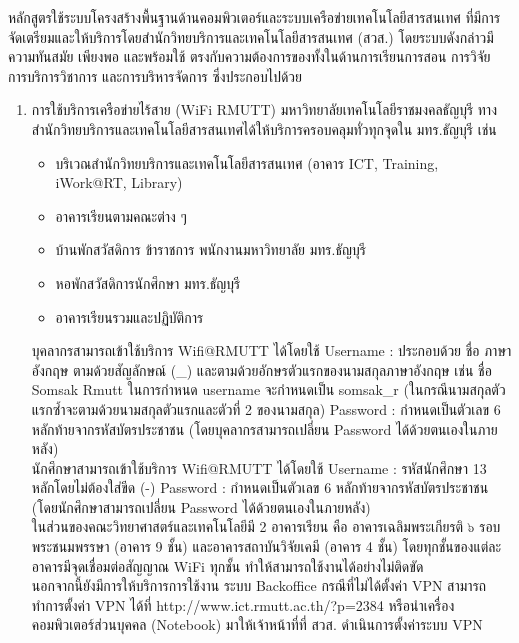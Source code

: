 หลักสูตรใช้ระบบโครงสร้างพื้นฐานด้านคอมพิวเตอร์และระบบเครือข่ายเทคโนโลยีสารสนเทศ ที่มีการจัดเตรียมและให้บริการโดยสำนักวิทยบริการและเทคโนโลยีสารสนเทศ (สวส.) โดยระบบดังกล่าวมีความทันสมัย เพียงพอ และพร้อมใช้ ตรงกับความต้องการของทั้งในด้านการเรียนการสอน การวิจัย การบริการวิชาการ และการบริหารจัดการ ซึ่งประกอบไปด้วย
\begin{enumerate}
	\item การใช้บริการเครือข่ายไร้สาย (WiFi RMUTT) มหาวิทยาลัยเทคโนโลยีราชมงคลธัญบุรี ทางสำนักวิทยบริการและเทคโนโลยีสารสนเทศได้ให้บริการครอบคลุมทั่วทุกจุดใน มทร.ธัญบุรี เช่น
	\begin{itemize}[label=-]
	\item  บริเวณสำนักวิทยบริการและเทคโนโลยีสารสนเทศ (อาคาร ICT, Training, iWork@RT, Library)
	\item อาคารเรียนตามคณะต่าง ๆ
	\item บ้านพักสวัสดิการ ข้าราชการ พนักงานมหาวิทยาลัย มทร.ธัญบุรี
	\item หอพักสวัสดิการนักศึกษา มทร.ธัญบุรี
	\item อาคารเรียนรวมและปฏิบัติการ
\end{itemize}
\hspace*{1cm}บุคลากรสามารถเข้าใช้บริการ Wifi@RMUTT ได้โดยใช้ Username : ประกอบด้วย ชื่อ
	ภาษาอังกฤษ ตามด้วยสัญลักษณ์ (\_) และตามด้วยอักษรตัวแรกของนามสกุลภาษาอังกฤษ เช่น ชื่อ Somsak Rmutt ในการกำหนด username จะกำหนดเป็น somsak\_r (ในกรณีนามสกุลตัวแรกซ้ำจะตามด้วยนามสกุลตัวแรกและตัวที่ 2 ของนามสกุล) Password : กำหนดเป็นตัวเลข 6 หลักท้ายจากรหัสบัตรประชาชน
	(โดยบุคลากรสามารถเปลี่ยน Password ได้ด้วยตนเองในภายหลัง) \\[0.2cm]
\hspace*{1cm}นักศึกษาสามารถเข้าใช้บริการ Wifi@RMUTT ได้โดยใช้ Username :  รหัสนักศึกษา 13 หลักโดยไม่ต้องใส่ขีด (-) Password : กำหนดเป็นตัวเลข 6 หลักท้ายจากรหัสบัตรประชาชน
(โดยนักศึกษาสามารถเปลี่ยน Password ได้ด้วยตนเองในภายหลัง)\\[0.2cm]
\hspace*{1cm}ในส่วนของคณะวิทยาศาสตร์และเทคโนโลยีมี 2 อาคารเรียน คือ อาคารเฉลิมพระเกียรติ ๖ รอบพระชนมพรรษา (อาคาร 9 ชั้น) และอาคารสถาบันวิจัยเคมี (อาคาร 4 ชั้น) โดยทุกชั้นของแต่ละอาคารมีจุดเชื่อมต่อสัญญาณ WiFi ทุกชั้น ทำให้สามารถใช้งานได้อย่างไม่ติดขัด \\[0.2cm]
\hspace*{1cm}นอกจากนี้ยังมีการให้บริการการใช้งาน ระบบ Backoffice กรณีที่ไม่ได้ตั้งค่า VPN สามารถทำการตั้งค่า VPN ได้ที่ http://www.ict.rmutt.ac.th/?p=2384  หรือนำเครื่องคอมพิวเตอร์ส่วนบุคคล (Notebook) มาให้เจ้าหน้าที่ที่ สวส. ดำเนินการตั้งค่าระบบ VPN \\[0.2cm]

\end{enumerate}
